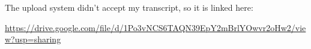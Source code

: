 \documentclass[12pt]{article}
\begin{document}
    The upload system didn't accept my transcript, so it is linked here:

    \url{https://drive.google.com/file/d/1Po3vNCS6TAQN39EpY2mBrlYOwvr2oHw2/view?usp=sharing}
\end{document}
